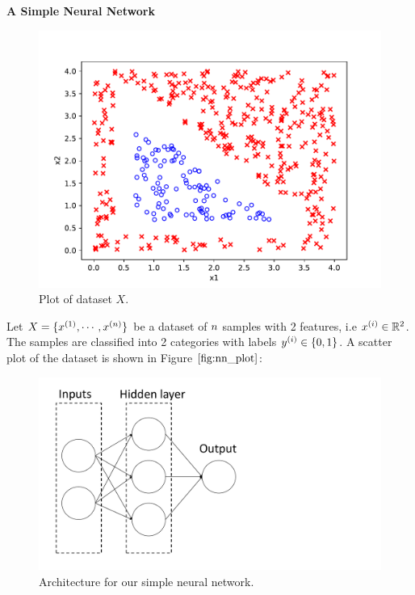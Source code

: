 \item {} {\bf A Simple Neural Network}

\begin{figure}[htbp]
  \centering
  \includegraphics[scale=0.5]{simple_nn/nn_plot.pdf}
  \caption{Plot of dataset $X$.}
  \label{fig:nn_plot}
\end{figure}

Let $X = \{x^{(1)}, \cdots, x^{({n})}\}$ be a dataset of ${n}$ samples with 2 features, i.e $x^{(i)} \in \mathbb{R}^2$. The samples are classified into 2 categories with labels $y^{(i)} \in \{0, 1\}$. A scatter plot of the dataset is shown in Figure $\ref{fig:nn_plot}$:

\begin{figure}[htbp]
  \centering
  \includegraphics[scale=0.2, trim = 0 0 360 0, clip]{simple_nn/nn_architecture.pdf}
  \caption{Architecture for our simple neural network.}
   \label{fig:nn_arc}
\end{figure}

